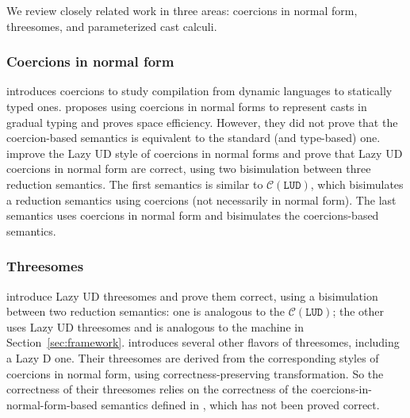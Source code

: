 \documentclass[runningheads]{llncs}
\newcommand{\CMachine}[1]{\ensuremath{\mathcal{C}(#1)}}
\newcommand{\LUDMachine}{\CMachine{\BLUD}}
\newcommand{\BLUD}[0]{\ensuremath{\mathtt{LUD}}}
\begin{document}

We review closely related work in three areas: coercions in normal
form, threesomes, and parameterized cast calculi.

\subsubsection{Coercions in normal form}

\citet{henglein1994dynamic} introduces coercions to study compilation
from dynamic languages to statically typed
ones. \citet{herman2010space} proposes using coercions in normal forms
to represent casts in gradual typing and proves space efficiency.
However, they did not prove that the coercion-based semantics is
equivalent to the standard (and type-based)
one. \citet{Siek:2015:BCT:2737924.2737968} improve the Lazy UD style
of coercions in normal forms and prove that Lazy UD coercions in
normal form are correct, using two bisimulation between three
reduction semantics. The first semantics is similar to \LUDMachine,
which bisimulates a reduction semantics using coercions (not
necessarily in normal form). The last semantics uses coercions in
normal form and bisimulates the coercions-based semantics.


\subsubsection{Threesomes}

\citet{Siek:2010:TWB:1706299.1706342} introduce Lazy UD threesomes and
prove them correct, using a bisimulation between two reduction
semantics: one is analogous to the \LUDMachine; the other uses Lazy UD
threesomes and is analogous to the machine in
Section~\ref{sec:framework}.  \citet{Garcia:2013:CTB:2500365.2500603}
introduces several other flavors of threesomes, including a Lazy D
one. Their threesomes are derived from the corresponding styles of
coercions in normal form, using correctness-preserving
transformation. So the correctness of their threesomes relies on the
correctness of the coercions-in-normal-form-based semantics defined in
\citet{herman2010space}, which has not been proved correct.
\end{document}
